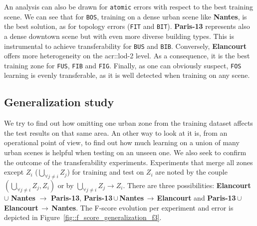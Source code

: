         An analysis can also be drawn for \texttt{atomic} errors with respect to the best training scene.
        We can see that for \texttt{BOS}, training on a dense urban scene like \textbf{Nantes}, is the best solution, as for topology errors (\texttt{FIT} and \texttt{BIT}).
        \textbf{Paris-13} represents also a dense downtown scene but with even more diverse building types.
        This is instrumental to achieve transferability for \texttt{BUS} and \texttt{BIB}.
        Conversely, \textbf{Elancourt} offers more heterogeneity on the \gls{acr::lod}-2 level.
        As a consequence, it is the best training zone for \texttt{FUS}, \texttt{FIB} and \texttt{FIG}.
        Finally, as one can obviously suspect, \texttt{FOS} learning is evenly transferable, as it is well detected when training on any scene.

    \subsection{Generalization study}
        \label{subsec::more_experiments::scalability::generalization}
        We try to find out how omitting one urban zone from the training dataset affects the test results on that same area.
        An other way to look at it is, from an operational point of view, to find out how much learning on a union of many urban scenes is helpful when testing on an unseen one.
        We also seek to confirm the outcome of the transferability experiments.
        Experiments that merge all zones except $Z_i$ ($\underset{\forall j \neq i}{\bigcup} Z_j$) for training and test on $Z_i$ are noted by the couple $(\underset{\forall j \neq i}{\bigcup} Z_j, Z_i)$ or by $ \underset{\forall j \neq i}{\bigcup} Z_j \rightarrow Z_i$.
        There are three possibilities: \textbf{Elancourt} $\cup$ \textbf{Nantes} \(\rightarrow\) \textbf{Paris-13}, \mbox{\textbf{Paris-13}}\,$\cup$\,\textbf{Nantes}\,\(\rightarrow\)\,\textbf{Elancourt} and \mbox{\textbf{Paris-13}}\,$\cup$\,\textbf{Elancourt}\,\(\rightarrow\)\,\textbf{Nantes}.
        The F-score evolution per experiment and error is depicted in Figure~\ref{fig::f_score_generalization_f3}.\\
    
